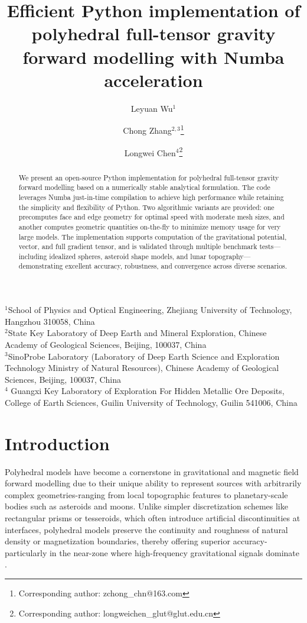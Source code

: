 \documentclass{seg}
\title{Efficient Python implementation of polyhedral full-tensor gravity forward modelling with Numba acceleration}
\author{%
  Leyuan Wu$^{1}$ \and
  Chong Zhang$^{2,3}$\thanks{Corresponding author: zchong\_chn@163.com} \and
  Longwei Chen$^{4}$\thanks{Corresponding author: longweichen\_glut@glut.edu.cn}
}
\begin{document}
\linenumbers

\maketitle

\begin{center}
    \footnotesize
    $^{1}$School of Physics and Optical Engineering, Zhejiang University of Technology, Hangzhou 310058, China \\
    $^{2}$State Key Laboratory of Deep Earth and Mineral Exploration, Chinese Academy of Geological Sciences, Beijing, 100037, China  \\
    $^{3}$SinoProbe Laboratory (Laboratory of Deep Earth Science and Exploration Technology Ministry of Natural Resources), Chinese Academy of Geological Sciences, Beijing, 100037, China \\
    $^{4}$ Guangxi Key Laboratory of Exploration For Hidden Metallic Ore Deposits, College of Earth Sciences, Guilin University of Technology, Guilin 541006, China
\end{center}

\newpage

\begin{abstract}
We present an open-source Python implementation for polyhedral full-tensor gravity forward modelling based on a numerically stable analytical formulation. The code leverages Numba just-in-time compilation to achieve high performance while retaining the simplicity and flexibility of Python. Two algorithmic variants are provided: one precomputes face and edge geometry for optimal speed with moderate mesh sizes, and another computes geometric quantities on-the-fly to minimize memory usage for very large models. The implementation supports computation of the gravitational potential, vector, and full gradient tensor, and is validated through multiple benchmark tests—including idealized spheres, asteroid shape models, and lunar topography—demonstrating excellent accuracy, robustness, and convergence across diverse scenarios.
\end{abstract}

\section{Introduction}

Polyhedral models have become a cornerstone in gravitational and magnetic field forward modelling due to their unique ability to represent sources with arbitrarily complex geometries-ranging from local topographic features to planetary-scale bodies such as asteroids and moons. Unlike simpler discretization schemes like rectangular prisms or tesseroids, which often introduce artificial discontinuities at interfaces, polyhedral models preserve the continuity and roughness of natural density or magnetization boundaries, thereby offering superior accuracy-particularly in the near-zone where high-frequency gravitational signals dominate 
\citep{Tsoulis2001JournalofGeodesy,Hikida2007Icarus,Benedek2018JGeod,Zhang2018JGeod,Hirt2019GeophysicalResearchLetters,Holzrichter2019Geophys.J.Int.,Saraswati2019JGeod}.
\end{document}
